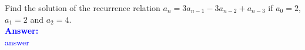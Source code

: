 \item{}
Find the solution of the recurrence relation $a_n=3a_{n-1}-3a_{n-2}+a_{n-3}$ if
$a_0=2$, $a_1=2$ and $a_2=4$.\\[12pt]
\ifanswers
\textcolor{blue}{
\textbf{Answer:}\\[6pt]
answer
}
\newpage
\fi
